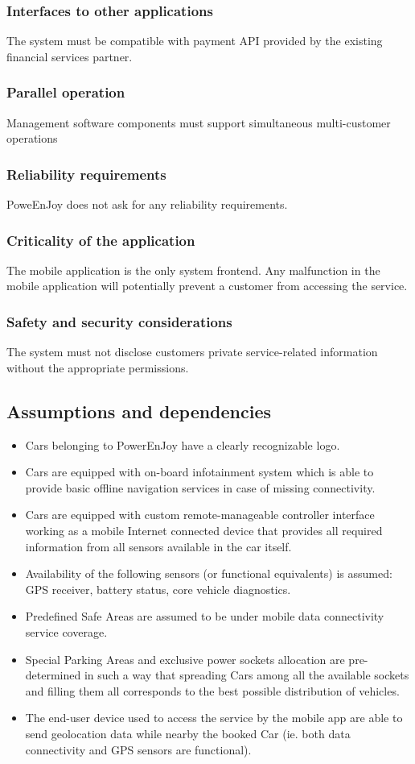 \documentclass{article}
\begin{document}
\subsubsection{Interfaces to other applications}
The system must be compatible with payment API provided by the existing financial services partner.
\subsubsection{Parallel operation}
Management software components must support simultaneous multi-customer operations 
\subsubsection{Reliability requirements}
PoweEnJoy does not ask for any reliability requirements.
\subsubsection{Criticality of the application}
The mobile application is the only system frontend. Any malfunction in the mobile application will potentially prevent a customer from accessing the service.
\subsubsection{Safety and security considerations}
The system must not disclose customers private service-related information without the appropriate permissions.
\subsection{Assumptions and dependencies}
\begin{itemize}
\item Cars belonging to PowerEnJoy have a clearly recognizable logo.
\item Cars are equipped with on-board infotainment system which is able to provide basic offline navigation services in case of missing connectivity.
\item Cars are equipped with custom remote-manageable controller interface working as a mobile Internet connected device that provides all required information from all sensors available in the car itself.
\item Availability of the following sensors (or functional equivalents) is assumed: GPS receiver, battery status, core vehicle diagnostics.
\item Predefined Safe Areas are assumed to be under mobile data connectivity service coverage.
\item Special Parking Areas and exclusive power sockets allocation are pre-determined in such a way that spreading Cars among all the available sockets and filling them all corresponds to the best possible distribution of vehicles.
\item The end-user device used to access the service by the mobile app are able to send geolocation data while nearby the booked Car (ie. both data connectivity and GPS sensors are functional).
\end{itemize}
\end{document}
